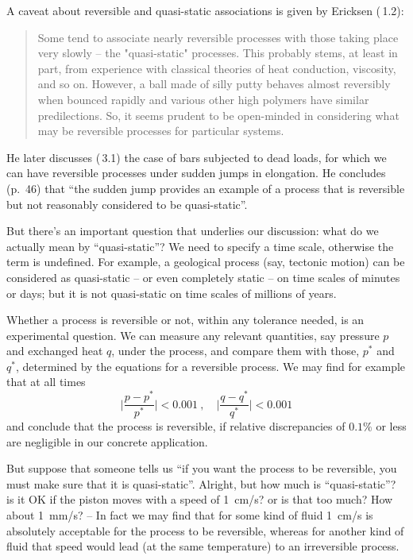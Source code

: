 A caveat about reversible and quasi-static associations is given by Ericksen (\sect\,1.2):
\begin{quote}
  Some tend to associate nearly reversible processes with those taking place very slowly -- the "quasi-static" processes. This probably stems, at least in part, from experience with classical theories of heat conduction, viscosity, and so on. However, a ball made of silly putty behaves almost reversibly when bounced rapidly and various other high polymers have similar predilections. So, it seems prudent to be open-minded in considering what may be reversible processes for particular systems.
\end{quote}
He later discusses (\sect\,3.1) the case of bars subjected to dead loads, for which we can have reversible processes under sudden jumps in elongation. He concludes (p.~46) that \enquote{the sudden jump provides an example of a process that is reversible but not reasonably considered to be quasi-static}.

\medskip

But there's an important question that underlies our discussion: what do we actually mean by \enquote{quasi-static}? We need to specify a time scale, otherwise the term is undefined. For example, a geological process (say, tectonic motion) can be considered as quasi-static -- or even completely static -- on time scales of minutes or days; but it is not quasi-static on time scales of millions of years.

Whether a process is reversible or not, within any tolerance needed, is an experimental question. We can measure any relevant quantities, say pressure $p$ and exchanged heat $q$, under the process, and compare them with those, $p^*$ and $q^*$, determined by the equations for a reversible process. We may find for example that at all times
$$\biggl\lvert\frac{p - p^*}{p^*}\biggr\rvert < 0.001 \ ,
\quad
\biggl\lvert\frac{q - q^*}{q^*}\biggr\rvert < 0.001
$$
and conclude that the process is reversible, if relative discrepancies of $0.1\%$ or less are negligible in our concrete application.

But suppose that someone tells us \enquote{if you want the process to be reversible, you must make sure that it is quasi-static}. Alright, but how much is \enquote{quasi-static}? is it OK if the piston moves with a speed of 1~cm/s? or is that too much? How about 1~mm/s? -- In fact we may find that for some kind of fluid 1~cm/s is absolutely acceptable for the process to be reversible, whereas for another kind of fluid that speed would lead (at the same temperature) to an irreversible process.

